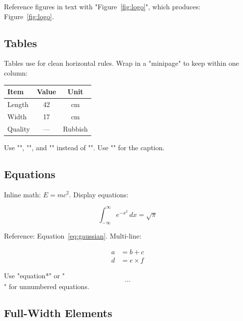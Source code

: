 \documentclass{rubbish}
\begin{document}
\begin{rubbishbody}
\noindent Reference figures in text with
"Figure~\ref{fig:logo}",
which produces: Figure~\ref{fig:logo}.

\subsection{Tables}

Tables use  for clean horizontal rules. Wrap in a
"minipage" to keep within one column:

\vspace{6pt}
\noindent
\begin{minipage}{\columnwidth}
\vspace{2pt}
\centering
\small
\begin{tabular}{@{}lcc@{}}
  \toprule
  \textbf{Item} & \textbf{Value} & \textbf{Unit} \\
  \midrule
  Length         & 42             & cm             \\
  Width          & 17             & cm             \\
  Quality        & ---            & Rubbish        \\
  \bottomrule
\end{tabular}
\end{minipage}
\vspace{6pt}

\noindent Use "\toprule",
"\midrule", and "\bottomrule"
instead of "\hline". Use
"" for the caption.

\subsection{Equations}

Inline math: $E = mc^2$. Display equations:

\begin{equation}
  \int_{-\infty}^{\infty} e^{-x^2}\,dx = \sqrt{\pi}
  \label{eq:gaussian}
\end{equation}

\noindent Reference: Equation~\ref{eq:gaussian}. Multi-line:

\begin{align}
  a &= b + c \\
  d &= e \times f
\end{align}

\noindent Use "equation*" or "\[...\]" for unnumbered equations.

\subsection{Full-Width Elements}


\end{rubbishbody}
\end{document}
